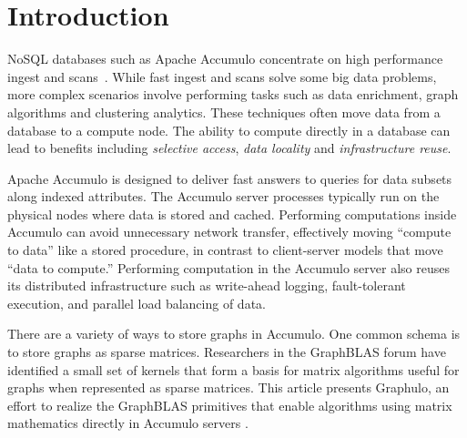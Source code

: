 
\section{Introduction}
\label{sIntro}
% 


NoSQL databases such as Apache Accumulo
concentrate on high performance ingest and scans~\cite{sen2013benchmarking}. 
While fast ingest and scans solve some big data problems,
more complex scenarios involve performing tasks
such as data enrichment, graph algorithms and clustering analytics. These techniques
often move data from a database %
to a compute node. The ability to
compute directly in a database can lead to benefits including 
\emph{selective access}, \emph{data locality} and \emph{infrastructure reuse}. 

Apache Accumulo is designed to deliver
fast answers to queries for data subsets along indexed attributes. 
The Accumulo server processes typically run on the physical nodes where data is stored and cached.
Performing computations inside Accumulo can avoid unnecessary network transfer,
effectively moving ``compute to data'' like a stored procedure,
in contrast to client-server models that move ``data to compute.''
Performing computation in the Accumulo server also reuses its distributed infrastructure
such as write-ahead logging, fault-tolerant execution, and 
parallel load balancing of data.

There are a variety of ways to store graphs in Accumulo.  One common schema is
to store graphs as sparse matrices.  
Researchers in the GraphBLAS forum \cite{mattson2014standards} 
have identified a small set of kernels
that form a basis for matrix algorithms useful for graphs
when represented as sparse matrices.
This article presents Graphulo, an effort to realize the GraphBLAS primitives 
that enable algorithms using matrix mathematics directly in Accumulo servers \cite{gadepally2015gabb}.

